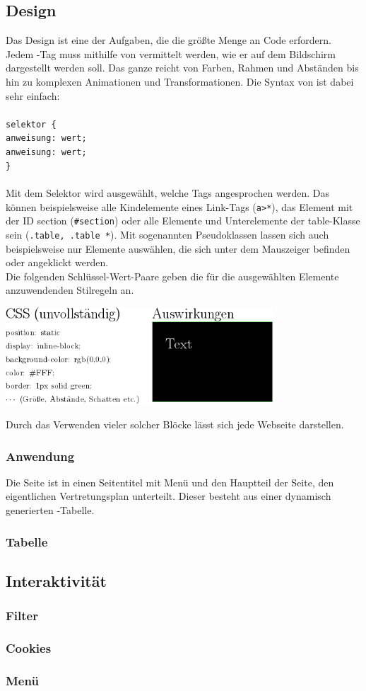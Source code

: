 \subsection{Design}
Das Design ist eine der Aufgaben, die die größte Menge an Code erfordern. Jedem \HTML-Tag muss mithilfe von \CSS vermittelt werden, wie er auf dem Bildschirm dargestellt werden soll. Das ganze reicht von Farben, Rahmen und Abständen bis hin zu komplexen Animationen und Transformationen. Die Syntax von \CSS ist dabei sehr einfach:\\\\
\texttt{selektor \{\\anweisung: wert;\\anweisung: wert;\\\}}\\\\
Mit dem Selektor wird ausgewählt, welche Tags angesprochen werden. Das können beispielsweise alle Kindelemente eines Link-Tags (\texttt{a>*}), das Element mit der ID section (\texttt{\#section}) oder alle Elemente und Unterelemente der table-Klasse sein (\texttt{.table, .table *}). Mit sogenannten Pseudoklassen lassen sich auch beispielsweise nur Elemente auswählen, die sich unter dem Mauszeiger befinden oder angeklickt werden.\\
Die folgenden Schlüssel-Wert-Paare geben die für die ausgewählten Elemente anzuwendenden Stilregeln an.\\
\begin{center}
	\includegraphics[width=0.75\textwidth]{texte/res/1.png}
\end{center}
Durch das Verwenden vieler solcher Blöcke lässt sich jede Webseite darstellen.\\
\subsubsection{Anwendung}
Die Seite ist in einen Seitentitel mit Menü und den Hauptteil der Seite, den eigentlichen Vertretungsplan unterteilt. Dieser besteht aus einer dynamisch generierten \CSS-Tabelle.
\subsubsection{Tabelle}
%


\subsection{Interaktivität}
\subsubsection{Filter}
%
\subsubsection{Cookies}
%
\subsubsection{Menü}
%

